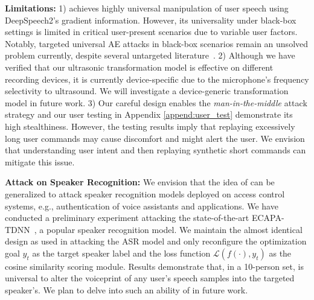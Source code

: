 \textbf{Limitations:}
1) \alias achieves highly universal manipulation of user speech using DeepSpeech2's gradient information. However, its universality under black-box settings is limited in critical user-present scenarios due to variable user factors. 
Notably, targeted universal AE attacks in black-box scenarios remain an unsolved problem currently, despite several untargeted literature~\cite{vadillo2019universal,neekhara2019universal}.
2) Although we have verified that our ultrasonic transformation model is effective on different recording devices, it is currently device-specific due to the microphone's frequency selectivity to ultrasound. We will investigate a device-generic transformation model in future work. 
3) Our careful design enables the \textit{man-in-the-middle} attack strategy and our user testing in Appendix \textsection\ref{append:user_test} demonstrate its high stealthiness. However, the testing results imply that replaying excessively long user commands may cause discomfort and might alert the user. We envision that understanding user intent and then replaying synthetic short commands can mitigate this issue.


\textbf{Attack on Speaker Recognition:} 
We envision that the idea of \alias can be generalized to attack speaker recognition models deployed on access control systems, e.g., authentication of voice assistants and applications. We have conducted a preliminary experiment attacking the state-of-the-art ECAPA-TDNN~\cite{2020ecapatdnn}, a popular speaker recognition model. We maintain the almost identical design as used in attacking the ASR model and only reconfigure the optimization goal $y_t$ as the target speaker label and the loss function $\mathcal{L}(f(\cdot),y_t)$ as the cosine similarity scoring module. Results demonstrate that, in a 10-person set, \alias is universal to alter the voiceprint of any user's speech samples into the targeted speaker's. We plan to delve into such an ability of \alias in future work.